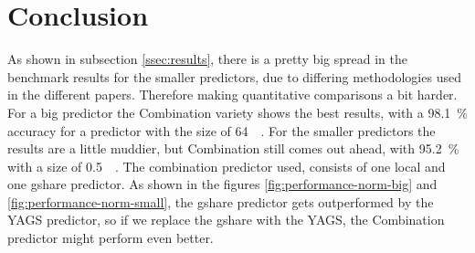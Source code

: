 \section{Conclusion}
\label{sec:conclusion}
As shown in subsection \ref{ssec:results}, there is a pretty big spread in the benchmark results for the smaller predictors, due to differing methodologies used in the different papers.
Therefore making quantitative comparisons a bit harder.
For a big predictor the Combination variety shows the best results, with a \SI{98.1}{\percent} accuracy for a predictor with the size of \SI{64}{\kilo\byte}.
For the smaller predictors the results are a little muddier, but Combination still comes out ahead, with \SI{95.2}{\percent} with a size of \SI{0.5}{\kilo\byte}.
The combination predictor used, consists of one local and one gshare predictor.
As shown in the figures \ref{fig:performance-norm-big} and \ref{fig:performance-norm-small}, the gshare predictor gets outperformed by the YAGS predictor, so if we replace the gshare with the YAGS, the Combination predictor might perform even better.